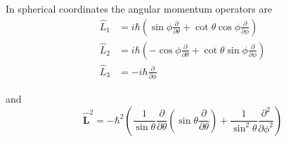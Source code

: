 In spherical coordinates the angular momentum operators are
\begin{align*}
\hat L_1&=i\hbar\left(\sin\phi\frac{\partial}{\partial\theta}
+\cot\theta\cos\phi\frac{\partial}{\partial\phi}\right)
\\
\hat L_2&=i\hbar\left(-\cos\phi\frac{\partial}{\partial\theta}
+\cot\theta\sin\phi\frac{\partial}{\partial\phi}\right)
\\
\hat L_3&=-i\hbar\frac{\partial}{\partial\phi}
\end{align*}

and
\begin{equation*}
\hat{\mathbf L}^2=-\hbar^2\left(\frac{1}{\sin\theta}\frac{\partial}{\partial\theta}
\left(\sin\theta\frac{\partial}{\partial\theta}\right)
+\frac{1}{\sin^2\theta}\frac{\partial^2}{\partial\phi^2}\right)
\end{equation*}


